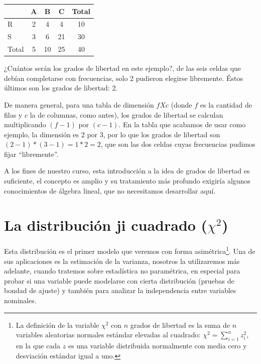 \documentclass[]{book}
\let\rmarkdownfootnote\footnote%
\def\footnote{\protect\rmarkdownfootnote}
\begin{document}
\begin{table}[H]
\centering
\begin{tabular}{lcccc}
\toprule
 & A & B & C & Total\\
\midrule
\rowcolor{gray!6}  R & 2 & 4 & 4 & 10\\
S & 3 & 6 & 21 & 30\\
\rowcolor{gray!6}  Total & 5 & 10 & 25 & 40\\
\bottomrule
\end{tabular}
\end{table}

¿Cuántos serán los grados de libertad en este ejemplo?, de las seis
celdas que debían completarse con frecuencias, solo 2 pudieron elegirse
libremente. Éstos últimos son los grados de libertad: 2.

De manera general, para una tabla de dimensión \(f X c\) (donde \(f\) es
la cantidad de filas y \(c\) la de columnas, como antes), los grados de
libertad se calculan multiplicando \((f-1)\) por \((c-1)\). En la tabla que
acabamos de usar como ejemplo, la dimensión es 2 por 3, por lo que los
grados de libertad son \((2-1)*(3-1)= 1*2=2\), que son las dos celdas
cuyas frecuencias pudimos fijar ``libremente''.

A los fines de nuestro curso, esta introducción a la idea de grados de
libertad es suficiente, el concepto es amplio y su tratamiento más
profundo exigiría algunos conocimientos de álgebra lineal, que no
necesitamos desarrollar aquí.

\hypertarget{la-distribuciuxf3n-ji-cuadrado-chi2}{%
\section{\texorpdfstring{La distribución ji cuadrado (\(\chi^{2}\))}{La distribución ji cuadrado (\textbackslash{}chi\^{}\{2\})}}\label{la-distribuciuxf3n-ji-cuadrado-chi2}}

Esta distribución es el primer modelo que veremos con forma
asimétrica\footnote{La definición de la variable \(\chi^{2}\) con \(n\) grados de
  libertad es la suma de \(n\) variables aleatorias normales estándar
  elevadas al cuadrado: \(\chi^{2} = \sum_{i = 1}^{n}z_{i}^{2}\), en la
  que cada \(z\) es una variable distribuida normalmente con media cero
  y desviación estándar igual a uno.}. Una de sus aplicaciones es la estimación de la
varianza, nosotros la utilizaremos más adelante, cuando tratemos sobre
estadística no paramétrica, en especial para probar si una variable
puede modelarse con cierta distribución (pruebas de bondad de ajuste) y
también para analizar la independencia entre variables nominales.
\end{document}
